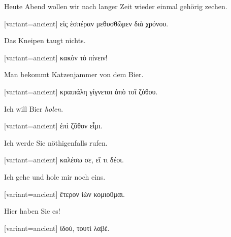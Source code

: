 Heute Abend wollen wir nach langer Zeit wieder einmal gehörig zechen.

\switchcolumn

\begin{greek}[variant=ancient]%
εἰς ἑσπέραν μεθυσθῶμεν διὰ χρόνου.

\end{greek}%
\switchcolumn*

Das Kneipen taugt nichts.

\switchcolumn

\begin{greek}[variant=ancient]%
κακὸν τὸ πίνειν!

\end{greek}%
\switchcolumn*

Man bekommt Katzenjammer von dem Bier.

\switchcolumn

\begin{greek}[variant=ancient]%
κραιπάλη γίγνεται ἀπὸ τοῖ ζύθου.

\end{greek}%
\switchcolumn*

Ich will Bier \emph{holen}.

\switchcolumn

\begin{greek}[variant=ancient]%
ἐπὶ ζῦθον εἶμι.

\end{greek}%
\switchcolumn*

Ich werde Sie nöthigenfalls rufen.

\switchcolumn

\begin{greek}[variant=ancient]%
καλέσω σε, εἴ τι δέοι.

\end{greek}%
\switchcolumn*

Ich gehe und hole mir noch eins.

\switchcolumn

\begin{greek}[variant=ancient]%
ἕτερον ἰὼν κομιοῦμαι.

\end{greek}%
\switchcolumn*

Hier haben Sie es!

\switchcolumn

\begin{greek}[variant=ancient]%
ἰδού, τουτὶ λαβέ.

\end{greek}%
\switchcolumn*

